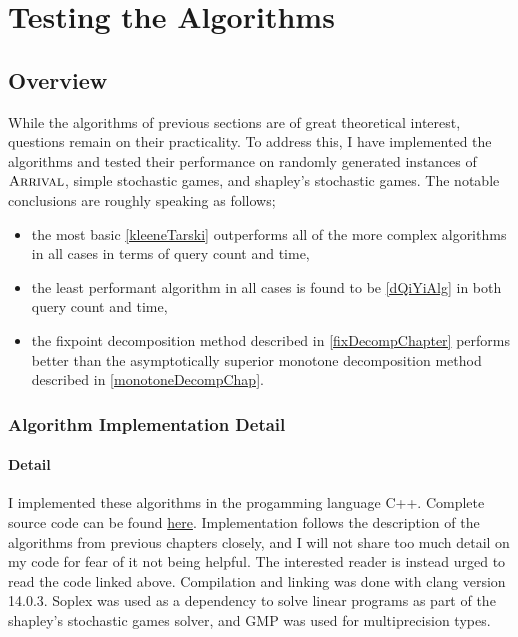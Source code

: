 \chapter{Testing the Algorithms}
\newcommand{\code}[1]{\lstinline|#1|}
\section{Overview}
While the algorithms of previous sections are of great theoretical interest,
questions remain on their practicality. To address this,
I have implemented the algorithms and tested their performance on
randomly generated instances of $\textsc{Arrival}$, simple stochastic games, and
shapley's stochastic games. The notable conclusions are roughly speaking as follows;
\begin{itemize}
  \item the most basic \cref{kleeneTarski} outperforms all of the
more complex algorithms in all cases in terms of query count and time,
\item the least performant algorithm in all cases is found to be \cref{dQiYiAlg} in both
  query count and time,
  \item the fixpoint decomposition method described in \cref{fixDecompChapter} performs better than the asymptotically superior
monotone decomposition method described in \cref{monotoneDecompChap}.
\end{itemize}

\subsection{Algorithm Implementation Detail}
\subsubsection{Detail}
I implemented these algorithms in the progamming language C++. 
Complete source code can be found \href{https://github.com/angusjoshi/tarski}{here}.
Implementation follows the description of the algorithms from previous chapters closely,
and I will not share too much detail on my code for fear of it not being helpful. The interested
reader is instead urged to read the code linked above. Compilation and linking was done with
clang version 14.0.3. Soplex\citep{soplex} was used as a dependency to solve linear programs
as part of the shapley's stochastic games solver, and GMP\citep{gmp} was used for multiprecision types. \\
